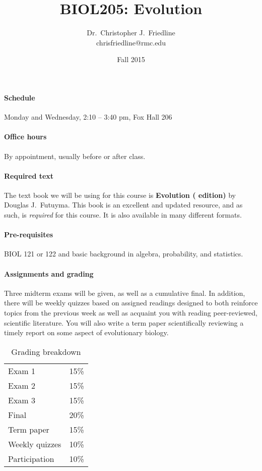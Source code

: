 \documentclass{article}
\title{BIOL205: Evolution}
\author{Dr.\ Christopher J.\ Friedline \\ 
chrisfriedline@rmc.edu}
\date{Fall 2015}
\begin{document}
\maketitle
\linespread{1.3}

\paragraph{Schedule}
Monday and Wednesday, 2:10 -- 3:40 pm, Fox Hall 206

\paragraph{Office hours}
By appointment, usually before or after class.

\paragraph{Required text}
The text book we will be using for this course is \textbf{Evolution (
edition)} by Douglas J.\ Futuyma. This book is an excellent and updated
resource,
and as such, is \textit{required} for this course. It is also available in many
different formats.

\paragraph{Pre-requisites}
BIOL 121 or 122 and basic background in algebra, probability, and statistics.

\paragraph{Assignments and grading}
Three midterm exams will be given, as well
as a cumulative final.  In addition, there will be weekly quizzes based on
assigned readings designed to both reinforce topics from the previous week as
well as acquaint you with reading peer-reviewed, scientific literature.  You
will also write a term paper scientifically reviewing a timely report on some
aspect of evolutionary biology.

\begin{table}[h]
\centering
\caption*{Grading breakdown}

\begin{tabular}{l|r}
Exam 1          &   15\% \\
Exam 2          &   15\% \\
Exam 3			& 	15\% \\
Final           &   20\% \\ 
Term paper      &   15\% \\
Weekly quizzes  &	10\% \\
Participation   &   10\% \\

\end{tabular}

\end{table}
\end{document}
